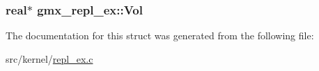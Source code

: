 \hypertarget{structgmx__repl__ex_a5e1b811378050e41e69c0f0a3d53c180}{
\subsubsection[{\-Vol}]{\setlength{\rightskip}{0pt plus 5cm}real$\ast$ {\bf gmx\-\_\-repl\-\_\-ex\-::\-Vol}}}\label{structgmx__repl__ex_a5e1b811378050e41e69c0f0a3d53c180}


\-The documentation for this struct was generated from the following file\-:\begin{DoxyCompactItemize}
\item 
src/kernel/\hyperlink{repl__ex_8c}{repl\-\_\-ex.\-c}\end{DoxyCompactItemize}
